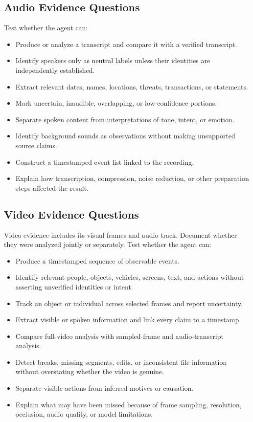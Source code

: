 \documentclass[12pt,letterpaper]{article}
\begin{document}
\subsection{Audio Evidence Questions}
Test whether the agent can:
\begin{itemize}
    \item Produce or analyze a transcript and compare it with a verified transcript.
    \item Identify speakers only as neutral labels unless their identities are independently established.
    \item Extract relevant dates, names, locations, threats, transactions, or statements.
    \item Mark uncertain, inaudible, overlapping, or low-confidence portions.
    \item Separate spoken content from interpretations of tone, intent, or emotion.
    \item Identify background sounds as observations without making unsupported source claims.
    \item Construct a timestamped event list linked to the recording.
    \item Explain how transcription, compression, noise reduction, or other preparation steps affected the result.
\end{itemize}

\subsection{Video Evidence Questions}
Video evidence includes its visual frames and audio track. Document whether they were analyzed jointly or separately. Test whether the agent can:
\begin{itemize}
    \item Produce a timestamped sequence of observable events.
    \item Identify relevant people, objects, vehicles, screens, text, and actions without asserting unverified identities or intent.
    \item Track an object or individual across selected frames and report uncertainty.
    \item Extract visible or spoken information and link every claim to a timestamp.
    \item Compare full-video analysis with sampled-frame and audio-transcript analysis.
    \item Detect breaks, missing segments, edits, or inconsistent file information without overstating whether the video is genuine.
    \item Separate visible actions from inferred motives or causation.
    \item Explain what may have been missed because of frame sampling, resolution, occlusion, audio quality, or model limitations.
\end{itemize}
\end{document}
